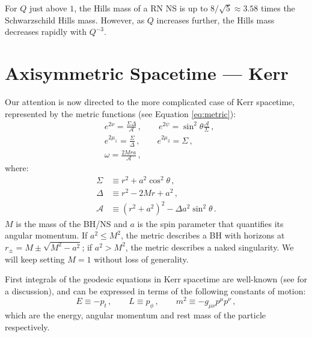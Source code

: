 \documentclass[
    reprint,
    prd,
    nofootinbib,
    amsmath,amssymb,
    aps,
    floatfix,
]{revtex4-2}
\begin{document}
For $Q$ just above $1$, the Hills mass of a RN NS is up to $8/\sqrt{5} \approx 3.58$ times the Schwarzschild Hills mass. However, as $Q$ increases further, the Hills mass decreases rapidly with $Q^{-3}$.


\section{Axisymmetric Spacetime --- Kerr} \label{sec:kerr}


Our attention is now directed to the more complicated case of Kerr spacetime, represented by the metric functions (see Equation \ref{eq:metric}):
\begin{equation}
    \begin{split}
        &e^{2\nu} = \frac{\Sigma \Delta}{\mathcal{A}} \, , \qquad e^{2\psi} = \sin^{2}{\theta} \frac{\mathcal{A}}{\Sigma} \, , \\
        &e^{2\mu_{1}} = \frac{\Sigma}{\Delta} \, , \qquad e^{2\mu_{2}} = \Sigma \, , \\
        &\omega = \frac{2Mra}{\mathcal{A}} \, ,
    \end{split}
\end{equation}
where:
\begin{equation}
    \begin{split}
        \Sigma &\equiv r^{2} + a^{2}\cos^{2}{\theta} \, , \\
        \Delta &\equiv r^{2} - 2Mr + a^{2} \, , \\
        \mathcal{A} &\equiv (r^{2} + a^{2})^{2} - \Delta a^{2} \sin^{2}{\theta} \, .
    \end{split}
\end{equation}
$M$ is the mass of the BH/NS and $a$ is the spin parameter that quantifies its angular momentum. If $a^{2} \le M^{2}$, the metric describes a BH with horizons at $r_{\pm} = M \pm \sqrt{M^{2} - a^{2}}$; if $a^{2} > M^{2}$, the metric describes a naked singularity. We will keep setting $M = 1$ without loss of generality.

First integrals of the geodesic equations in Kerr spacetime are well-known (see \cite{Bardeen1972, Carter2009} for a discussion), and can be expressed in terms of the following constants of motion:
\begin{equation}
    E \equiv -p_{t} \, , \qquad L \equiv p_{\phi} \, , \qquad m^{2} \equiv -g_{\mu \nu} p^{\mu} p^{\nu} \, ,
\end{equation}
which are the energy, angular momentum and rest mass of the particle respectively.
\end{document}
